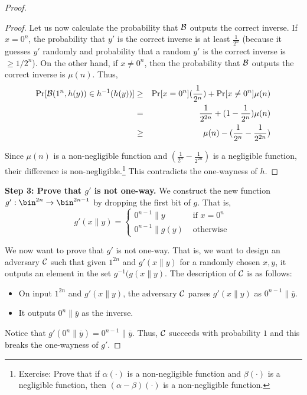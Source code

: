 \begin{proof}
\begin{proof}
Let us now calculate the probability that $\mathcal{B}$ outputs the correct inverse. If $x = 0^n$, the probability that $y'$ is the correct inverse is at least $\frac{1}{2^n}$ (because it guesses $y'$ randomly and probability that a random $y'$ is the correct inverse is $\geq 1/2^n$). On the other hand, if $x \neq 0^n$, then the probability that $\mathcal{B}$ outputs the correct inverse is $\mu(n)$. Thus,
\begin{eqnarray*}
\Pr[\mathcal{B}(1^n,h(y)) \in h^{-1}(h(y))] & \geq & \Pr[x = 0^n](\frac{1}{2^n}) + \Pr[x \neq 0^n]\mu(n)\\
& = & \frac{1}{2^{2n}} + (1 - \frac{1}{2^n}) \mu(n) \\
& \geq & \mu(n) - (\frac{1}{2^{n}} - \frac{1}{2^{2n}})
\end{eqnarray*}

Since $\mu(n)$ is a non-negligible function and $(\frac{1}{2^{n}} - \frac{1}{2^{2n}})$ is a negligible function, their difference is non-negligible.\footnote{Exercise: Prove that if $\alpha(\cdot)$ is a non-negligible function and $\beta(\cdot)$ is a negligible function, then $(\alpha - \beta)(\cdot)$ is a non-negligible function.} This contradicts the one-wayness of $h$.

\end{proof} 


\noindent\textbf{Step 3: Prove that $g'$ is not one-way.} 
We construct the new function $g': \bin^{2n} \rightarrow \bin^{2n-1}$ by dropping the first bit of $g$. That is,
$$
g'(x\|y) = \begin{cases}
 0^{n-1}\|y &\text{    if } x = 0^n\\
0^{n-1}\|g(y) &\text{    otherwise }
\end{cases}
$$

We now want to prove that $g'$ is not one-way. That is, we want to design an adversary $\mathcal{C}$ such that given $1^{2n}$ and $g'(x \| y)$ for a randomly chosen $x,y$, it outputs an element in the set $g^{-1}(g(x \| y)$. The description of $\mathcal{C}$ is as follows:

\begin{itemize}
\item On input $1^{2n}$ and $g'(x \| y)$, the adversary $\mathcal{C}$ parses $g'(x \| y)$ as $0^{n-1} \| \overline{y}$.
\item It outputs $0^{n} \| \overline{y}$ as the inverse.
\end{itemize}
Notice that $g'(0^{n} \| \overline{y}) = 0^{n-1} \| \overline{y}$. Thus, $\mathcal{C}$ succeeds with probability $1$ and this breaks the one-wayness of $g'$.

\end{proof}


